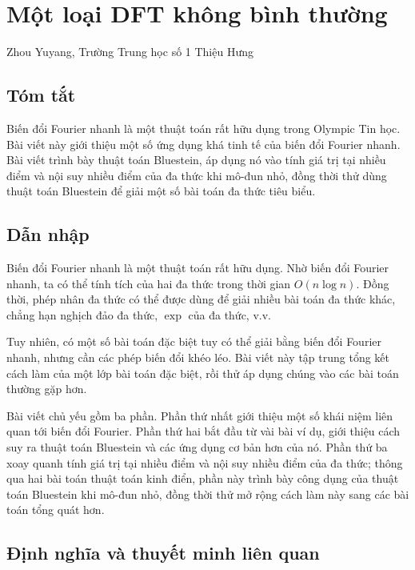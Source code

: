 \documentclass[11pt]{article}
\begin{document}
\section{Một loại DFT không bình thường}

\begin{center}
Zhou Yuyang, Trường Trung học số 1 Thiệu Hưng
\end{center}

\subsection*{Tóm tắt}

Biến đổi Fourier nhanh là một thuật toán rất hữu dụng trong Olympic Tin học.
Bài viết này giới thiệu một số ứng dụng khá tinh tế của biến đổi Fourier nhanh.
Bài viết trình bày thuật toán Bluestein, áp dụng nó vào tính giá trị tại nhiều
điểm và nội suy nhiều điểm của đa thức khi mô-đun nhỏ, đồng thời thử dùng thuật
toán Bluestein để giải một số bài toán đa thức tiêu biểu.

\subsection{Dẫn nhập}

Biến đổi Fourier nhanh là một thuật toán rất hữu dụng. Nhờ biến đổi Fourier
nhanh, ta có thể tính tích của hai đa thức trong thời gian \(O(n\log n)\). Đồng
thời, phép nhân đa thức có thể được dùng để giải nhiều bài toán đa thức khác,
chẳng hạn nghịch đảo đa thức, \(\exp\) của đa thức, v.v.

Tuy nhiên, có một số bài toán đặc biệt tuy có thể giải bằng biến đổi Fourier
nhanh, nhưng cần các phép biến đổi khéo léo. Bài viết này tập trung tổng kết
cách làm của một lớp bài toán đặc biệt, rồi thử áp dụng chúng vào các bài toán
thường gặp hơn.

Bài viết chủ yếu gồm ba phần. Phần thứ nhất giới thiệu một số khái niệm liên
quan tới biến đổi Fourier. Phần thứ hai bắt đầu từ vài bài ví dụ, giới thiệu
cách suy ra thuật toán Bluestein và các ứng dụng cơ bản hơn của nó. Phần thứ ba
xoay quanh tính giá trị tại nhiều điểm và nội suy nhiều điểm của đa thức; thông
qua hai bài toán thuật toán kinh điển, phần này trình bày công dụng của thuật
toán Bluestein khi mô-đun nhỏ, đồng thời thử mở rộng cách làm này sang các bài
toán tổng quát hơn.

\subsection{Định nghĩa và thuyết minh liên quan}
\end{document}
